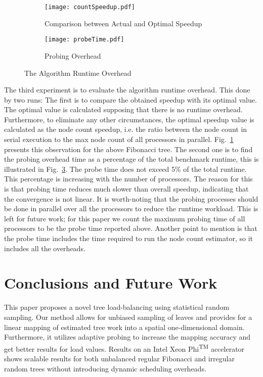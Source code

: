 \documentclass[conference,compsoc]{IEEEtran}
\begin{document}
\begin{figure}
	\begin{subfigure}{\columnwidth}
		\centering
		\texttt{[image: countSpeedup.pdf]}
		\caption{\label{figCountSpeedup}Comparison between Actual and Optimal Speedup}
	\end{subfigure}
	\begin{subfigure}{\columnwidth}
		\centering
		\texttt{[image: probeTime.pdf]}
		\caption{\label{figProbeTime}Probing Overhead}
	\end{subfigure}
	\caption{The Algorithm Runtime Overhead}
\end{figure}
The third experiment is to evaluate the algorithm runtime overhead. This done by two runs: The first is to compare the obtained speedup with its optimal value. The optimal value is calculated supposing that there is no runtime overhead. Furthermore, to eliminate any other circumstances, the optimal speedup value is calculated as the node count speedup, i.e. the ratio between the node count in serial execution to the max node count of all processors in parallel. Fig.~\ref{figCountSpeedup} presents this observation for the above Fibonacci tree. The second one is to find the probing overhead time as a percentage of the total benchmark runtime, this is illustrated in Fig.~\ref{figProbeTime}. The probe time does not exceed 5\% of the total runtime. This percentage is increasing with the number of processors. The reason for this is that probing time reduces much slower than overall speedup, indicating that the convergence is not linear. It is worth-noting that the probing processes should be done in parallel over all the processors to reduce the runtime workload. This is left for future work; for this paper we count the maximum probing time of all processors to be the probe time reported above. Another point to mention is that the probe time includes the time required to run the node count estimator, so it includes all the overheads.
\section{Conclusions and Future Work}
\label{conclusions}
This paper proposes a novel tree load-balancing using statistical random sampling. Our method allows for unbiased sampling of leaves and provides for a linear mapping of estimated tree work into a spatial one-dimensional domain. Furthermore, it utilizes adaptive probing to increase the mapping accuracy and get better results for load values. Results on an Intel\textsuperscript{\textregistered} Xeon Phi\textsuperscript{TM} accelerator shows scalable results for both unbalanced regular Fibonacci and irregular random trees without introducing dynamic scheduling overheads.
\end{document}
